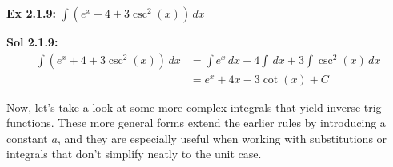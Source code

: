  \begin{tcolorbox}[example]
    \textbf{Ex 2.1.9: } $\int \left(e^x + 4 + 3\csc^2 (x)\right) \, dx$
 \end{tcolorbox}
 \begin{tcolorbox}[solution]
    \textbf{Sol 2.1.9: } \begin{align*}
        \int \left(e^x + 4 + 3\csc^2 (x)\right) \, dx &= \int e^x \, dx + 4\int \, dx + 3\int \csc^2 (x) \, dx \\[11pt]
        & = \boxed{e^x + 4x - 3\cot (x) + C}
    \end{align*}
 \end{tcolorbox} 

Now, let's take a look at some more complex integrals that yield inverse trig functions. These more general forms extend the earlier rules by introducing a constant $a$, and they are especially useful when working with substitutions or integrals that don't simplify neatly to the unit case. \par

\begin{center}
\end{center}

 